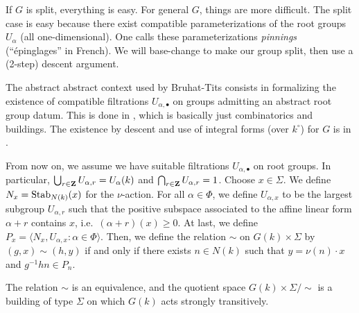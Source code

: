 \documentclass{article}
\begin{document}
If $G$ is split, everything is easy. For general $G$, things are more 
difficult. The split case is easy because there exist compatible parameterizations 
of the root groups $U_\alpha$ (all one-dimensional). One calls these 
parameterizations \emph{pinnings} (``\'epinglages'' in French). We will 
base-change to make our group split, then use a (2-step) descent argument. 

The abstract abstract context used by Bruhat-Tits consists in formalizing the 
existence of compatible filtrations $U_{\alpha,\bullet}$ on groups admitting 
an abstract root group datum. This is done in \cite{bt72}, which is basically 
just combinatorics and buildings. The existence by descent and use of integral 
forms (over $k^\circ$) for $G$ is in \cite{bt84}. 

From now on, we assume we have suitable filtrations $U_{\alpha,\bullet}$ on 
root groups. In particular, $\bigcup_{r\in \mathbf{Z}} U_{\alpha,r} = U_\alpha(k)$ 
and $\bigcap_{r\in \mathbf{Z}} U_{\alpha,r} = 1$. Choose $x\in \Sigma$. We define 
$N_x=\operatorname{Stab}_{N(k)}(x)$ for the $\nu$-action. For all 
$\alpha\in \Phi$, we define $U_{\alpha,x}$ to be the largest subgroup 
$U_{\alpha,r}$ such that the positive subspace associated to the affine linear form 
$\alpha+r$ contains $x$, i.e.\ $(\alpha+r)(x)\geqslant 0$. At last, we 
define $P_x=\langle N_x,U_{\alpha,x}:\alpha\in \Phi\rangle$. Then, we define the 
relation $\sim$ on $G(k)\times \Sigma$ by 
$(g,x)\sim(h,y)$ if and only if there exists $n\in N(k)$ such that 
$y=\nu(n)\cdot x$ and $g^{-1} h n\in P_n$. 

\begin{theorem}
The relation $\sim$ is an equivalence, and the quotient space 
$G(k)\times \Sigma/\sim$ is a building of type $\Sigma$ on which $G(k)$ acts 
strongly transitively. 
\end{theorem}







\end{document}
